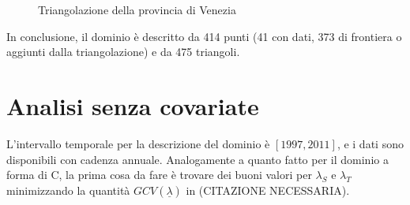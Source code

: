 \documentclass[a4paper,11pt,twoside,openright]{book}							%
\begin{document}
\begin{figure}[!t]
\centering
{}
\caption{Triangolazione della provincia di Venezia}
\label{fig:Ven_rgm}
\end{figure}

In conclusione, il dominio è descritto da 414 punti (41 con dati, 373 di frontiera o aggiunti dalla triangolazione) e da 475 triangoli.


\section{Analisi senza covariate}
L'intervallo temporale per la descrizione del dominio è $[1997,2011]$, e i dati sono disponibili con cadenza annuale. Analogamente a quanto fatto per il dominio a forma di C, la prima cosa da fare è trovare dei buoni valori per $\lambda_S$ e $\lambda_T$ minimizzando la quantità $GCV(\underline \lambda)$ in (CITAZIONE NECESSARIA).
\end{document}

